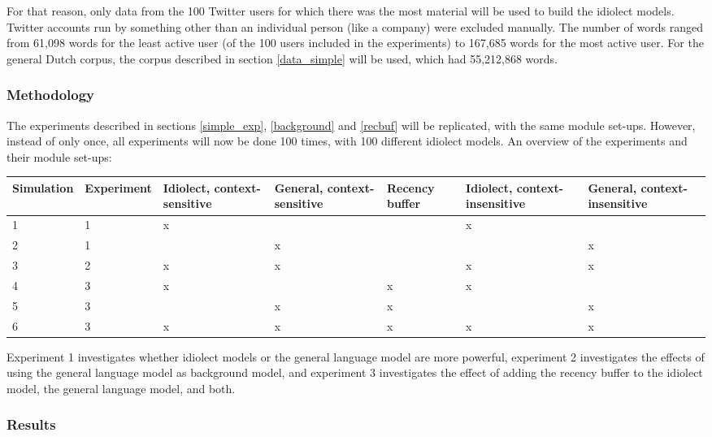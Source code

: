 \documentclass[12pt]{article}
\let\originaltable\table
\let\endoriginaltable\endtable
\renewenvironment{table}[1][ht]{%
  \originaltable[#1]
  \centering}%
  {\endoriginaltable}
\begin{document}

For that reason, only data from the 100 Twitter users for which there was the most material will be used to build the idiolect models. Twitter accounts run by something other than an individual person (like a company) were excluded manually. The number of words ranged from 61,098 words for the least active user (of the 100 users included in the experiments) to 167,685 words for the most active user. For the general Dutch corpus, the corpus described in section \ref{data_simple} will be used, which had 55,212,868 words.

\subsubsection{Methodology}

The experiments described in sections \ref{simple_exp}, \ref{background} and \ref{recbuf} will be replicated, with the same module set-ups. However, instead of only once, all experiments will now be done 100 times, with 100 different idiolect models. An overview of the experiments and their module set-ups:


\begin{table}[H] \footnotesize
\begin{tabular}{l|l|p{1.2cm}p{1.2cm}p{1.2cm}p{1.2cm}p{1.2cm}} 
Simulation&Experiment&Idiolect, context-sensitive&General, context-sensitive&Recency buffer&Idiolect, context-insensitive&General, context-insensitive\\
\hline
1&1&x&&&x&\\
2&1&&x&&&x\\

3&2&x&x&&x&x\\

4&3&x&&x&x&\\
5&3&&x&x&&x\\
6&3&x&x&x&x&x\\

\end{tabular} 
\caption{Overview of all module set-ups} 
\end{table}

Experiment 1 investigates whether idiolect models or the general language model are more powerful, experiment 2 investigates the effects of using the general language model as background model, and experiment 3 investigates the effect of adding the recency buffer to the idiolect model, the general language model, and both.

\subsubsection{Results}
\end{document}
